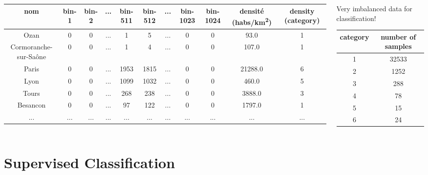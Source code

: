 \documentclass[c]{beamer}
\begin{document}
\begin{frame}
\begin{columns}
\begin{column}{0.8\textwidth}
\begin{table}
\begin{center}
\begin{adjustbox}{max width=0.9\textwidth}
\begin{tabular}{|c|c|c|c|c|c|c|c|c|c|c|}
\hline 
nom &  bin-1 & bin-2 & ... & bin-511 & bin-512 &... & bin-1023 & bin-1024 & densité (habs/km\textsuperscript{2})  & density (category)\\
\hline 
Ozan & 0 & 0 & ... & 1 & 5 & ... & 0 & 0 & 93.0 & 1\\
\hline 
Cormoranche-sur-Sa\^{o}ne & 0 & 0 & ... & 1 & 4 & ... & 0 & 0 & 107.0 & 1\\
\hline 
Paris & 0 & 0 & ... & 1953 & 1815 & ... & 0 & 0 & 21288.0 & 6\\
\hline
Lyon & 0 & 0 & ... & 1099 & 1032 & ... & 0 & 0 & 460.0 & 5\\
\hline
Tours & 0 & 0 & ... & 268 & 238 & ... & 0 & 0 & 3888.0 & 3\\
\hline
Besancon & 0 & 0 & ... & 97 & 122 & ... & 0 & 0 & 1797.0 & 1\\
\hline 
... & ... & ... & ... & ... & ... & ... & ... & ... & ... & ... \\
\hline
\end{tabular}
\end{adjustbox}
\end{center}
\end{table}
\end{column}
\begin{column}{0.35\textwidth}
{\tiny
\begin{alertblock}{Very imbalanced data for classification!}
\begin{table}
 \begin{tabular}{|c|c|}
  \hline
  category & number of samples\\
  \hline
  1 & 32533\\
  \hline
  2 & 1252\\
  \hline
  3 & 288\\
  \hline
  4 & 78\\
  \hline
  5 & 15\\
  \hline
  6 & 24 \\
  \hline
 \end{tabular}
\end{table}
\end{alertblock}
}
\end{column}
\end{columns}
\end{frame}

\section{Supervised Classification}
\end{document}
